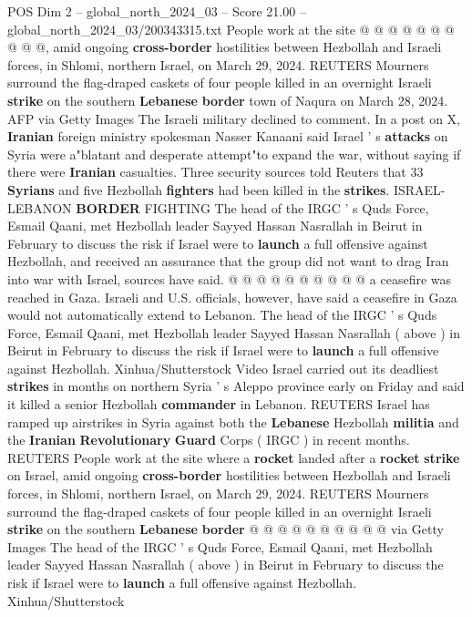 \begin{textsample}{POS Dim 2 – global\_north\_2024\_03 – Score 21.00 – global\_north\_2024\_03/200343315.txt}
People work at the site @ @ @ @ @ @ @ @ @ @, amid ongoing \textbf{cross-border} hostilities between Hezbollah and Israeli forces, in Shlomi, northern Israel, on March 29, 2024.
REUTERS Mourners surround the flag-draped caskets of four people killed in an overnight Israeli \textbf{strike} on the southern \textbf{Lebanese} \textbf{border} town of Naqura on March 28, 2024.
AFP via Getty Images The Israeli military declined to comment.
In a post on X, \textbf{Iranian} foreign ministry spokesman Nasser Kanaani said Israel ' s \textbf{attacks} on Syria were a"blatant and desperate attempt"to expand the war, without saying if there were \textbf{Iranian} casualties.
Three security sources told Reuters that 33 \textbf{Syrians} and five Hezbollah \textbf{fighters} had been killed in the \textbf{strikes}.
ISRAEL-LEBANON \textbf{BORDER} FIGHTING The head of the IRGC ' s Quds Force, Esmail Qaani, met Hezbollah leader Sayyed Hassan Nasrallah in Beirut in February to discuss the risk if Israel were to \textbf{launch} a full offensive against Hezbollah, and received an assurance that the group did not want to drag Iran into war with Israel, sources have said. @ @ @ @ @ @ @ @ @ @ a ceasefire was reached in Gaza.
Israeli and U.S. officials, however, have said a ceasefire in Gaza would not automatically extend to Lebanon.
The head of the IRGC ' s Quds Force, Esmail Qaani, met Hezbollah leader Sayyed Hassan Nasrallah ( above ) in Beirut in February to discuss the risk if Israel were to \textbf{launch} a full offensive against Hezbollah.
Xinhua/Shutterstock Video Israel carried out its deadliest \textbf{strikes} in months on northern Syria ' s Aleppo province early on Friday and said it killed a senior Hezbollah \textbf{commander} in Lebanon.
REUTERS Israel has ramped up airstrikes in Syria against both the \textbf{Lebanese} Hezbollah \textbf{militia} and the \textbf{Iranian} \textbf{Revolutionary} \textbf{Guard} Corps ( IRGC ) in recent months.
REUTERS People work at the site where a \textbf{rocket} landed after a \textbf{rocket} \textbf{strike} on Israel, amid ongoing \textbf{cross-border} hostilities between Hezbollah and Israeli forces, in Shlomi, northern Israel, on March 29, 2024.
REUTERS Mourners surround the flag-draped caskets of four people killed in an overnight Israeli \textbf{strike} on the southern \textbf{Lebanese} \textbf{border} @ @ @ @ @ @ @ @ @ @ via Getty Images The head of the IRGC ' s Quds Force, Esmail Qaani, met Hezbollah leader Sayyed Hassan Nasrallah ( above ) in Beirut in February to discuss the risk if Israel were to \textbf{launch} a full offensive against Hezbollah.
Xinhua/Shutterstock

\end{textsample}
